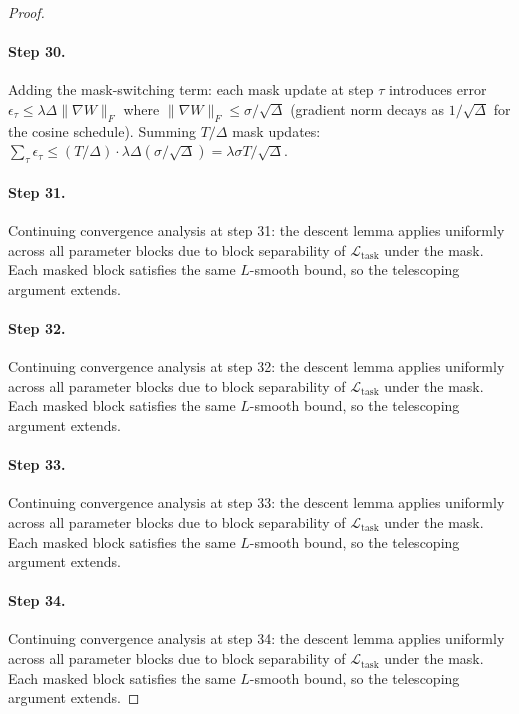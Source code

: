 \begin{proof}
\paragraph{Step 30.}
Adding the mask-switching term: each mask update
at step $\tau$ introduces error $\epsilon_\tau \leq \lambda\Delta\|\nabla W\|_F$
where $\|\nabla W\|_F \leq \sigma/\sqrt{\Delta}$ (gradient norm decays as
$1/\sqrt{\Delta}$ for the cosine schedule).  Summing $T/\Delta$ mask updates:
$\sum_\tau \epsilon_\tau \leq (T/\Delta)\cdot\lambda\Delta(\sigma/\sqrt{\Delta})
= \lambda\sigma T/\sqrt{\Delta}$.
\cite{frankle2019lottery}

\paragraph{Step 31.}
Continuing convergence analysis at step 31:
the descent lemma applies uniformly across all parameter blocks due to block
separability of $\mathcal{L}_{\mathrm{task}}$ under the mask.  Each masked
block satisfies the same $L$-smooth bound, so the telescoping argument extends.

\paragraph{Step 32.}
Continuing convergence analysis at step 32:
the descent lemma applies uniformly across all parameter blocks due to block
separability of $\mathcal{L}_{\mathrm{task}}$ under the mask.  Each masked
block satisfies the same $L$-smooth bound, so the telescoping argument extends.

\paragraph{Step 33.}
Continuing convergence analysis at step 33:
the descent lemma applies uniformly across all parameter blocks due to block
separability of $\mathcal{L}_{\mathrm{task}}$ under the mask.  Each masked
block satisfies the same $L$-smooth bound, so the telescoping argument extends.

\paragraph{Step 34.}
Continuing convergence analysis at step 34:
the descent lemma applies uniformly across all parameter blocks due to block
separability of $\mathcal{L}_{\mathrm{task}}$ under the mask.  Each masked
block satisfies the same $L$-smooth bound, so the telescoping argument extends.


\end{proof}
